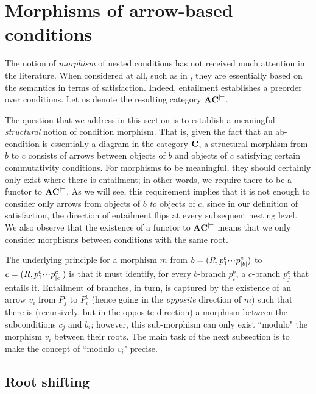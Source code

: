 \section{Morphisms of arrow-based conditions}

The notion of \emph{morphism} of nested conditions has not received much attention in the literature. When considered at all, such as in \cite{bchk:conditional-reactive-systems,sksclo:coinductive-techniques-for-satisfiability}, they are essentially based on the semantics in terms of satisfaction. Indeed, entailment establishes a preorder over conditions. Let us denote the resulting category $\mathbf{AC}^{\models}$.

The question that we address in this section is to establish a meaningful \emph{structural} notion of condition morphism. That is, given the fact that an ab-condition is essentially a diagram in the category $\mathbf{C}$, a structural morphism from $b$ to $c$ consists of arrows between objects of $b$ and objects of $c$ satisfying certain commutativity conditions. For morphisms to be meaningful, they should certainly only exist where there is entailment; in other words, we require there to be a functor to $\mathbf{AC}^{\models}$. As we will see, this requirement implies that it is not enough to consider only arrows from objects of $b$ \emph{to} objects of $c$, since in our definition of satisfaction, the direction of entailment flips at every subsequent nesting level. We also observe that the existence of a functor to $\mathbf{AC}^{\models}$ means that we only consider morphisms between conditions with the same root.

The underlying principle for a morphism $m$ from $b=(R,p^b_1{\cdotp\mkern-2mu\cdotp\mkern-2mu\cdotp\mkern1mu} p^c_{|b|})$ to $c=(R,p^c_1{\cdotp\mkern-2mu\cdotp\mkern-2mu\cdotp\mkern1mu} p^c_{|c|})$ is that it must identify, for every $b$-branch $p^b_i$, a $c$-branch $p^c_j$ that entails it. Entailment of branches, in turn, is captured by the existence of an arrow $v_i$ from $P^c_j$ to $P^b_i$ (hence going in the \emph{opposite} direction of $m$) such that there is (recursively, but in the opposite direction) a morphism between the subconditions $c_j$ and $b_i$; however, this sub-morphism can only exist ``modulo" the morphism $v_i$ between their roots. The main task of the next subsection is to make the concept of ``modulo $v_i$" precise.

\subsection{Root shifting}

